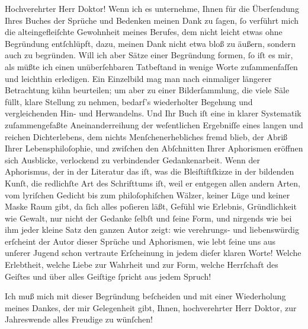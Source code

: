 \pstart{}Hochverehrter Herr Doktor!\pend\vspace{0.5em}
\pstart
           Wenn ich es unternehme, Ihnen für die Überſendung Ihres Buches der Sprüche und Bedenken meinen Dank zu{ }ſagen,{ }ſo verführt
               mich die alteingefleiſchte Gewohnheit meines Berufes, dem nicht leicht etwas ohne
               Begründung entſchlüpft, dazu, meinen Dank nicht etwa bloß zu äußern, sondern auch zu
               begründen. Will ich aber Sätze einer Begründung formen,{ }ſo iſt es mir, als müßte ich
               einen unüberſehbaren Tatbeſtand in wenige Worte zuſammenfaſſen und leichthin
               erledigen. Ein Einzelbild mag man nach einmaliger längerer Betrachtung {\pb}kühn beurteilen; um aber zu einer
               Bilderſammlung, die viele Säle füllt, klare Stellung zu nehmen, bedarf’s wiederholter
               Begehung und vergleichenden Hin- und Herwandelns. Und Ihr Buch iſt eine in klarer
               Systematik zuſammengefaßte Aneinanderreihung der weſentlichen Ergebniſſe eines langen
               und reichen Dichterlebens, dem nichts Menſchenerhebliches fremd blieb, der Abriß
               Ihrer Lebensphiloſophie, und zwiſchen den Abſchnitten Ihrer Aphorismen eröffnen sich
               Ausblicke, verlockend zu verbindender Gedankenarbeit. Wenn der Aphorismus, der in der
               Literatur das iſt, was die Bleiſtiftſkizze in der bildenden Kunſt, die redlichſte Art
               des Schrifttums iſt, weil er entgegen allen andern Arten, vom lyriſchen Gedicht bis
               zum philoſophiſchen Wälzer, keiner Lüge und keiner Maske Raum  gibt, {\pb}da{ }ſich alles poſieren läßt, Gefühl wie Erlebnis, Gründlichkeit wie Gewalt, nur
               nicht der Gedanke{ }ſelbſt und{ }ſeine Form, und nirgends wie bei ihm jeder kleine Satz
               den ganzen Autor zeigt: wie verehrungs- und liebenswürdig erſcheint der Autor dieser
               Sprüche und Aphorismen, wie lebt{ }ſeine uns aus unſerer Jugend schon vertraute
               Erſcheinung in jedem dieſer klaren Worte! Welche Erlebtheit, welche Liebe zur
               Wahrheit und zur Form, welche Herrſchaft des Geiſtes und über alles Geiſtige{ }ſpricht
               aus jedem Spruch!\pend
           
\pstart
           Ich muß mich mit dieser Begründung beſcheiden und mit einer Wiederholung meines
               Dankes, der mir Gelegenheit gibt, Ihnen, hochverehrter Herr Doktor, zur Jahreswende
               alles Freudige zu wünſchen!\pend
           

